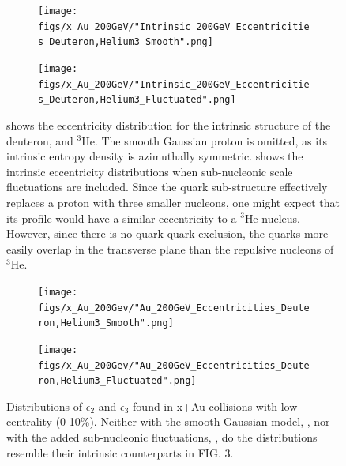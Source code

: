 \documentclass[twocolumn,showpacs,amsfonts,aps,prc,nofootinbib,floatfix]{revtex4}
\begin{document}
\begin{figure}
	\begin{center}
		\begin{subfigure}[h]{0.4\linewidth}
			\texttt{[image: figs/x\_Au\_200GeV/"Intrinsic\_200GeV\_Eccentricities\_Deuteron,Helium3\_Smooth".png]}
			\subcaption{\label{subfig:SmIntAu}}
		\end{subfigure}
		\begin{subfigure}[h]{0.4\linewidth}
			\texttt{[image: figs/x\_Au\_200GeV/"Intrinsic\_200GeV\_Eccentricities\_Deuteron,Helium3\_Fluctuated".png]}
			\subcaption{\label{subfig:FlIntAu}}
		\end{subfigure}
		\caption{ shows the eccentricity distribution for the intrinsic structure of the deuteron, and $^3$He. The smooth Gaussian proton is omitted, as its intrinsic entropy density is azimuthally symmetric.  shows the intrinsic eccentricity distributions when sub-nucleonic scale fluctuations are included. Since the quark sub-structure effectively replaces a proton with three smaller nucleons, one might expect that its profile would have a similar eccentricity to a $^3$He nucleus. However, since there is no quark-quark exclusion, the quarks more easily overlap in the transverse plane than the repulsive nucleons of $^3$He.}
		\label{fig:SmFlIntAu}
	\end{center}
\end{figure}
\begin{figure}
	\centering
	\begin{subfigure}[h]{0.4\linewidth}
		\centering
		\texttt{[image: figs/x\_Au\_200Gev/"Au\_200GeV\_Eccentricities\_Deuteron,Helium3\_Smooth".png]}
		\subcaption{\label{subfig:SmCentAu}}
	\end{subfigure}
	\begin{subfigure}[h]{0.4\linewidth}
		\centering
		\texttt{[image: figs/x\_Au\_200Gev/"Au\_200GeV\_Eccentricities\_Deuteron,Helium3\_Fluctuated".png]}
		\subcaption{\label{subfig:FlCentAu}}
	\end{subfigure}
	\caption{Distributions of $\epsilon_2$ and $\epsilon_3$ found in x+Au collisions with low centrality (0-10\%). Neither with the smooth Gaussian model, , nor with the added sub-nucleonic fluctuations, , do the distributions resemble their intrinsic counterparts in FIG. 3.}
	\label{fig:SmFlCentAu}
\end{figure}
\end{document}
